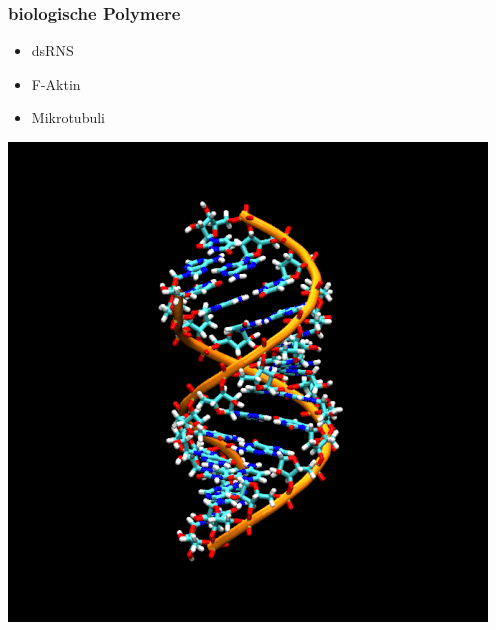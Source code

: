 \begin{frame}
  \frametitle{biologische Polymere}
	\begin{minipage}{0.3\textwidth}
    \begin{itemize}
      \item dsRNS
      \item F-Aktin
      \item Mikrotubuli
    \end{itemize} %
	\end{minipage}
	\hfill
	\begin{minipage}{0.3\textwidth}
	\includegraphics[width=\textwidth]{Plots/dsRNS.png}
	\end{minipage}
  \begin{minipage}{0.3\textwidth}

\end{minipage}
\end{frame}
